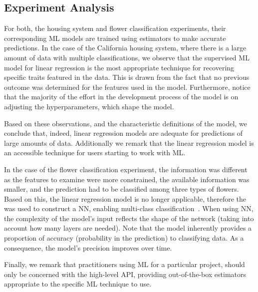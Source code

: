 \subsection{Experiment Analysis}

For both, the housing system and flower classification experiments, their corresponding \ac{ML} 
models are trained using estimators to make accurate predictions. In the case of the California 
housing system, where there is a large amount of data with multiple classifications, we observe that 
the supervised \ac{ML} model for linear regression is the most appropriate technique for recovering 
specific traits featured in the data. This is drawn from the fact that no previous outcome was 
determined for the features used in the model. 
Furthermore, notice that the majority of the effort in the development process of the model is on 
adjusting the hyperparameters, which shape the model.  

Based on these observations, and the characteristic definitions of the model, we conclude that, 
indeed, linear regression models are adequate for predictions of large amounts of data. Additionally 
we remark that the linear regression model is an accessible technique for users starting to work with 
\ac{ML}.  

In the case of the flower classification experiment, the information was different as the features to 
examine were more constrained, the available information was smaller, and the prediction had to be 
classified among three types of flowers. Based on this, the linear regression model is no longer 
applicable, therefore the  was used to construct a \ac{NN}, enabling 
multi-class classification~\cite{tensor18}.
When using \ac{NN}, the complexity of the model's input reflects the shape of the network (taking into 
account how many layers are needed). Note that the model inherently provides a proportion of 
accuracy (\ie probability in the prediction) to classifying data. As a consequence, the model's 
precision improves over time. 

Finally, we remark that practitioners using \ac{ML} for a particular project, should only be concerned 
with the high-level API, providing out-of-the-box estimators appropriate to the specific \ac{ML} 
technique to use.


\endinput

